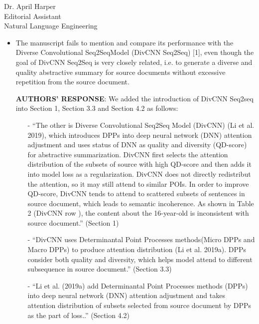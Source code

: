 \documentclass[11pt]{letter} %
\theoremstyle{definition}
\begin{document}
\begin{letter}{Dr. April Harper \\
            Editorial Assistant \\
			Natural Language Engineering}
\begin{enumerate}
\begin{itemize}
				\item The manuscript fails to mention and compare its performance with the Diverse Convolutional Seq2SeqModel (DivCNN Seq2Seq) [1], even though the goal of DivCNN Seq2Seq is very closely related, i.e. to generate a diverse and quality abstractive summary for source documents without excessive repetition from the source document.
				\item[] \textbf{AUTHORS' RESPONSE}:  
                We added the introduction of DivCNN Seq2seq into Section 1, Section 3.3 and Section 4.2
                as follows:
                 \begin{itemize}
                	\item[-] ``The other is Diverse Convolutional Seq2Seq
                	Model (DivCNN) (Li et al. 2019), 
                	which introduces DPPs into deep neural network (DNN) attention adjustment
                	and uses status of DNN as quality and diversity (QD-score) for abstractive summarization.
                	DivCNN first selects the attention distribution of the subsets of source with high QD-score
                	and then adds it into model loss as a regularization.
                	DivCNN does not directly redistribut the attention,
                	so it may still attend to similar POIs.
                	In order to improve QD-score, DivCNN tends to attend to scattered subsets of sentences in source document, 
                	which leads to semantic incoherence. 
                	As shown in Table 2 (DivCNN row ),
                	the content about the 16-year-old 
                	is inconsistent with source document.''  (Section 1)
                	\item[-] ``DivCNN uses Determinantal Point Processes methods(Micro DPPs and
                	Macro DPPs) to produce attention distribution (Li et al. 2019a). DPPs consider both quality and diversity, which helps model attend to different subsequence in source document.''  (Section 3.3)
                	\item[-] ``Li et al. (2019a) add Determinantal Point Processes methods (DPPs)
                	into deep neural network (DNN) attention adjustment
                	and takes attention distribution of
                	subsets selected from source document by DPPs as the part of loss..''  (Section 4.2)
                \end{itemize}
            

\end{itemize}
\end{enumerate}
\end{letter}
\end{document}

